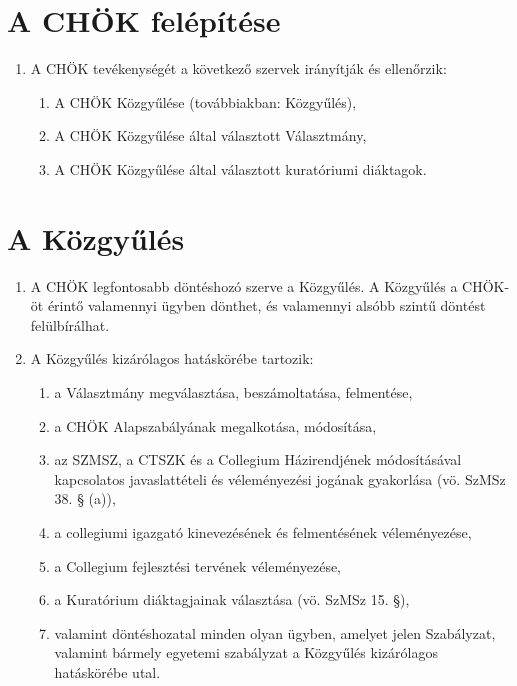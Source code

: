 \documentclass{rulebook}
\begin{document}
\section{A CHÖK felépítése}

\begin{enumerate}
	\item A CHÖK tevékenységét a következő szervek irányítják és ellenőrzik:
	\begin{enumerate}
		\item A CHÖK Közgyűlése (továbbiakban: Közgyűlés),
		\item A CHÖK Közgyűlése által választott Választmány,
		\item A CHÖK Közgyűlése által választott kuratóriumi diáktagok.
	\end{enumerate}	
\end{enumerate}



\section{A Közgyűlés}

\begin{enumerate}
	\item A CHÖK legfontosabb döntéshozó szerve a Közgyűlés. A Közgyűlés a CHÖK-öt érintő valamennyi ügyben dönthet, és valamennyi alsóbb szintű döntést felülbírálhat.
	\item A Közgyűlés kizárólagos hatáskörébe tartozik:
	\begin{enumerate}
		\item a Választmány megválasztása, beszámoltatása, felmentése,
		\item a CHÖK Alapszabályának megalkotása, módosítása,
		\item az SZMSZ, a CTSZK és a Collegium Házirendjének módosításával kapcsolatos javaslattételi és véleményezési jogának gyakorlása (vö. SzMSz 38. § (a)),
		\item a collegiumi igazgató kinevezésének és felmentésének véleményezése,
		\item a Collegium fejlesztési tervének véleményezése,
		\item a Kuratórium diáktagjainak választása (vö. SzMSz 15. §),
		\item valamint döntéshozatal minden olyan ügyben, amelyet jelen Szabályzat, valamint bármely egyetemi szabályzat a Közgyűlés kizárólagos hatáskörébe utal.
	\end{enumerate}
\end{enumerate}
\end{document}
